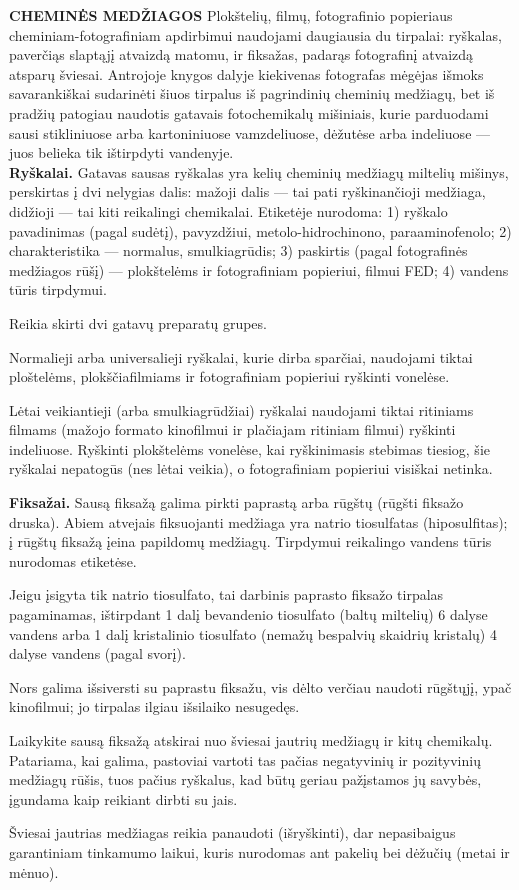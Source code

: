 \documentclass{book}
\begin{document}
				\textbf{CHEMINĖS MEDŽIAGOS}
				Plokštelių, filmų, fotografinio popieriaus cheminiam-fotografiniam apdirbimui naudojami daugiausia du tirpalai: ryškalas, paverčiąs slaptąjį atvaizdą matomu, ir fiksažas, padarąs fotografinį atvaizdą atsparų šviesai. Antrojoje knygos dalyje kiekivenas fotografas mėgėjas išmoks savarankiškai sudarinėti šiuos tirpalus iš pagrindinių cheminių medžiagų, bet iš pradžių patogiau naudotis gatavais fotochemikalų mišiniais, kurie parduodami sausi stikliniuose arba kartoniniuose vamzdeliuose, dėžutėse arba indeliuose --- juos belieka tik ištirpdyti vandenyje.\\

				\textbf{Ryškalai.} Gatavas sausas ryškalas yra kelių cheminių medžiagų miltelių mišinys, perskirtas į dvi nelygias dalis: mažoji dalis --- tai pati ryškinančioji medžiaga, didžioji --- tai kiti reikalingi chemikalai. Etiketėje nurodoma: 1) ryškalo pavadinimas (pagal sudėtį), pavyzdžiui, metolo-hidrochinono, paraaminofenolo; 2) charakteristika --- normalus, smulkiagrūdis; 3) paskirtis (pagal fotografinės medžiagos rūšį) --- plokštelėms ir fotografiniam popieriui, filmui FED; 4) vandens tūris tirpdymui.

				Reikia skirti dvi gatavų preparatų grupes.

				Normalieji arba universalieji ryškalai, kurie dirba sparčiai, naudojami tiktai ploštelėms, plokščiafilmiams ir fotografiniam popieriui ryškinti vonelėse.

				Lėtai veikiantieji (arba smulkiagrūdžiai) ryškalai naudojami tiktai ritiniams filmams (mažojo formato kinofilmui ir plačiajam ritiniam filmui) ryškinti indeliuose. Ryškinti plokštelėms vonelėse, kai ryškinimasis stebimas tiesiog, šie ryškalai nepatogūs (nes lėtai veikia), o fotografiniam popieriui visiškai netinka.

				\textbf{Fiksažai.} Sausą fiksažą galima pirkti paprastą arba rūgštų (rūgšti fiksažo druska). Abiem atvejais fiksuojanti medžiaga yra natrio tiosulfatas (hiposulfitas); į rūgštų fiksažą įeina papildomų medžiagų. Tirpdymui reikalingo vandens tūris nurodomas etiketėse.

				Jeigu įsigyta tik natrio tiosulfato, tai darbinis paprasto fiksažo tirpalas pagaminamas, ištirpdant 1 dalį bevandenio tiosulfato (baltų miltelių) 6 dalyse vandens arba 1 dalį kristalinio tiosulfato (nemažų bespalvių skaidrių kristalų) 4 dalyse vandens (pagal svorį).

				Nors galima išsiversti su paprastu fiksažu, vis dėlto verčiau naudoti rūgštųjį, ypač kinofilmui; jo tirpalas ilgiau išsilaiko nesugedęs.

				Laikykite sausą fiksažą atskirai nuo šviesai jautrių medžiagų ir kitų chemikalų.\\

				Patariama, kai galima, pastoviai vartoti tas pačias negatyvinių ir pozityvinių medžiagų rūšis, tuos pačius ryškalus, kad būtų geriau pažįstamos jų savybės, įgundama kaip reikiant dirbti su jais.

				Šviesai jautrias medžiagas reikia panaudoti (išryškinti), dar nepasibaigus garantiniam tinkamumo laikui, kuris nurodomas ant pakelių bei dėžučių (metai ir mėnuo).
\end{document}

